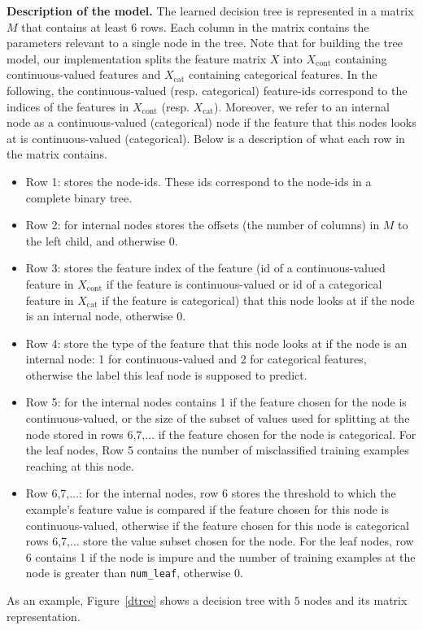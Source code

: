 \textbf{Description of the model.} 
The learned decision tree is represented in a matrix $M$ that
contains at least 6 rows. Each column in the matrix contains the parameters relevant to a single node in the tree. 
Note that for building the tree model, our implementation splits the feature matrix $X$ into $X_\text{cont}$ containing continuous-valued features and $X_\text{cat}$ containing categorical features. In the following, the continuous-valued (resp. categorical) feature-ids correspond to the indices of the features in $X_\text{cont}$ (resp. $X_\text{cat}$). 
Moreover, we refer to an internal node as a continuous-valued (categorical) node if the feature that this nodes looks at is continuous-valued (categorical).
Below is a description of what each row in the matrix contains.
\begin{itemize}
\item Row 1: stores the node-ids. These ids correspond to the node-ids in a complete binary tree.
\item Row 2: for internal nodes stores the offsets (the number of columns) in $M$ to the left child, and otherwise 0.
\item Row 3: stores the feature index of the feature (id of a continuous-valued feature in $X_\text{cont}$ if the feature is continuous-valued or id of a categorical feature in $X_\text{cat}$ if the feature is categorical) that this node looks at if the node is an internal node, otherwise 0. 
\item Row 4: store the type of the feature that this node looks at if the node is an internal node: 1 for continuous-valued and 2 for categorical features, 
otherwise the label this leaf node is supposed to predict.
\item Row 5: for the internal nodes contains 1 if the feature chosen for the node is continuous-valued, or the size of the subset of values used for splitting at the node stored in rows 6,7,$\ldots$ if the feature chosen for the node is categorical. For the leaf nodes, Row 5 contains the number of misclassified training examples reaching at this node. 
\item Row 6,7,$\ldots$: for the internal nodes, row 6 stores the threshold to which the example's feature value is compared if the feature chosen for this node is continuous-valued, otherwise if the feature chosen for this node is categorical rows 6,7,$\ldots$ store the value subset chosen for the node.
For the leaf nodes, row 6 contains 1 if the node is impure and the number of training examples at the node is greater than {\tt num\_leaf}, otherwise 0. 	
\end{itemize}
As an example, Figure~\ref{dtree} shows a decision tree with $5$ nodes and its matrix
representation.

